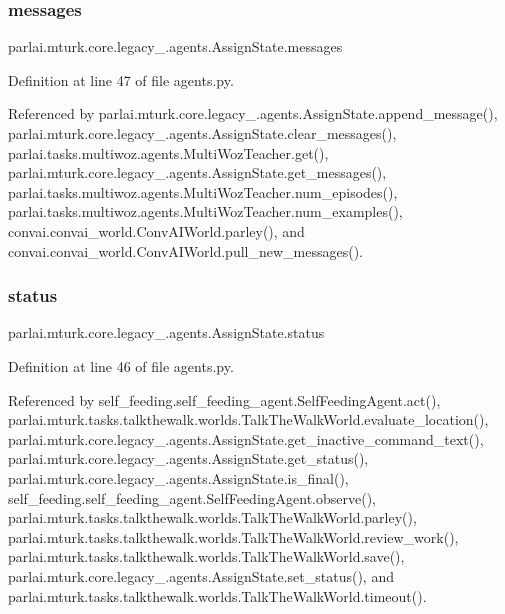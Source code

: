 \subsubsection{\texorpdfstring{messages}{messages}}
{\footnotesize\ttfamily parlai.\+mturk.\+core.\+legacy\+\_.\+agents.\+Assign\+State.\+messages}



Definition at line 47 of file agents.\+py.



Referenced by parlai.\+mturk.\+core.\+legacy\+\_.\+agents.\+Assign\+State.\+append\+\_\+message(), parlai.\+mturk.\+core.\+legacy\+\_.\+agents.\+Assign\+State.\+clear\+\_\+messages(), parlai.\+tasks.\+multiwoz.\+agents.\+Multi\+Woz\+Teacher.\+get(), parlai.\+mturk.\+core.\+legacy\+\_.\+agents.\+Assign\+State.\+get\+\_\+messages(), parlai.\+tasks.\+multiwoz.\+agents.\+Multi\+Woz\+Teacher.\+num\+\_\+episodes(), parlai.\+tasks.\+multiwoz.\+agents.\+Multi\+Woz\+Teacher.\+num\+\_\+examples(), convai.\+convai\+\_\+world.\+Conv\+A\+I\+World.\+parley(), and convai.\+convai\+\_\+world.\+Conv\+A\+I\+World.\+pull\+\_\+new\+\_\+messages().

\mbox{\label{classparlai_1_1mturk_1_1core_1_1legacy__2018_1_1agents_1_1AssignState_a256124e49cab161d21001e45e26a391a}} 
\subsubsection{\texorpdfstring{status}{status}}
{\footnotesize\ttfamily parlai.\+mturk.\+core.\+legacy\+\_.\+agents.\+Assign\+State.\+status}



Definition at line 46 of file agents.\+py.



Referenced by self\+\_\+feeding.\+self\+\_\+feeding\+\_\+agent.\+Self\+Feeding\+Agent.\+act(), parlai.\+mturk.\+tasks.\+talkthewalk.\+worlds.\+Talk\+The\+Walk\+World.\+evaluate\+\_\+location(), parlai.\+mturk.\+core.\+legacy\+\_.\+agents.\+Assign\+State.\+get\+\_\+inactive\+\_\+command\+\_\+text(), parlai.\+mturk.\+core.\+legacy\+\_.\+agents.\+Assign\+State.\+get\+\_\+status(), parlai.\+mturk.\+core.\+legacy\+\_.\+agents.\+Assign\+State.\+is\+\_\+final(), self\+\_\+feeding.\+self\+\_\+feeding\+\_\+agent.\+Self\+Feeding\+Agent.\+observe(), parlai.\+mturk.\+tasks.\+talkthewalk.\+worlds.\+Talk\+The\+Walk\+World.\+parley(), parlai.\+mturk.\+tasks.\+talkthewalk.\+worlds.\+Talk\+The\+Walk\+World.\+review\+\_\+work(), parlai.\+mturk.\+tasks.\+talkthewalk.\+worlds.\+Talk\+The\+Walk\+World.\+save(), parlai.\+mturk.\+core.\+legacy\+\_.\+agents.\+Assign\+State.\+set\+\_\+status(), and parlai.\+mturk.\+tasks.\+talkthewalk.\+worlds.\+Talk\+The\+Walk\+World.\+timeout().

